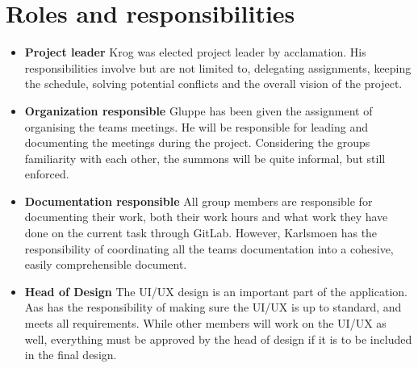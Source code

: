 \documentclass{article}
\begin{document}
\section{Roles and responsibilities}
\begin{itemize}
    \item \textbf{Project leader} \newline Krog was elected project leader by acclamation. His responsibilities involve but are not limited to, delegating assignments, keeping the schedule, solving potential conflicts and the overall vision of the project.
    \item \textbf{Organization responsible} \newline Gluppe has been given the assignment of organising the teams meetings. He will be responsible for leading and documenting the meetings during the project. Considering the groups familiarity with each other, the summons will be quite informal, but still enforced.
    \newpage
    \item \textbf{Documentation responsible} \newline All group members are responsible for documenting their work, both their work hours and what work they have done on the current task through GitLab. However, Karlsmoen has the responsibility of coordinating all the teams documentation into a cohesive, easily comprehensible document.  
    \item \textbf{Head of Design} \newline The UI/UX design is an important part of the application. Aas has the responsibility of making sure the UI/UX is up to standard, and meets all requirements. While other members will work on the UI/UX as well, everything must be approved by the head of design if it is to be included in the final design.
\end{itemize}
\end{document}
